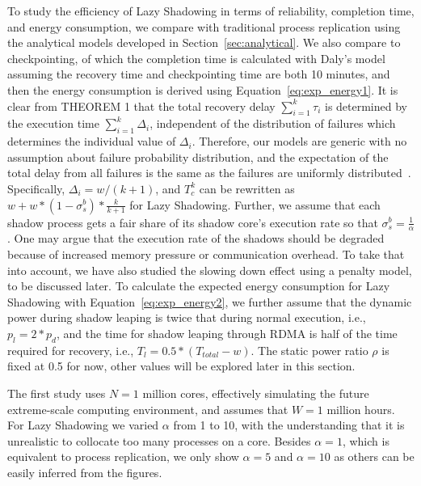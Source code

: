 To study the efficiency of Lazy Shadowing in terms of reliability, completion time, and energy consumption, we compare with traditional process replication using the analytical models developed in Section~\ref{sec:analytical}. We also compare to checkpointing, of which the completion time is calculated with Daly's model~\cite{daly_fgcs_2006} assuming the recovery time and checkpointing time are both 10 minutes, and then the energy consumption is derived using Equation~\ref{eq:exp_energy1}. 
It is clear from THEOREM 1 that the total recovery delay $\sum_{i=1}^k\tau_i$ is determined by the execution time $\sum_{i=1}^k\Delta_i$, independent of the distribution of failures which determines 
the individual value of $\Delta_i$. 
Therefore, our models are generic with no assumption about failure probability distribution, and the expectation of the total delay from all failures is the same as the failures are uniformly distributed~\cite{daly_fgcs_2006}. Specifically, $\Delta_i = w/(k+1)$, and $T_c^k$ can be rewritten as $w + w*(1-\sigma_s^b)*\frac{k}{k+1}$ for Lazy Shadowing. Further, we assume that each shadow process gets a fair share of its shadow core's execution rate so that $\sigma_s^b = \frac{1}{\alpha}$. One may argue that the execution rate of the shadows
should be degraded because of increased memory pressure or communication overhead. %
To take that into account, we have also studied the slowing down effect using a penalty model, to be discussed later. 
To calculate the expected energy consumption for Lazy Shadowing with Equation~\ref{eq:exp_energy2}, we further assume that the dynamic power during shadow leaping is twice that during normal execution, i.e., $p_{l}=2*p_d$, and the time for shadow leaping through RDMA is half of the time required for recovery, i.e., $T_l=0.5*(T_{total} - w)$. The static power ratio $\rho$ is fixed at 0.5 for now, other values will be explored later in this section.

The first study uses $N=1$ million cores, effectively simulating the future extreme-scale computing environment, and assumes that $W=1$ million hours. 
For Lazy Shadowing we varied $\alpha$ from 1 to 10, with the understanding that it is unrealistic to collocate too many processes on a core. Besides $\alpha=1$, which is equivalent to process replication, we only show $\alpha=5$ and $\alpha=10$ as others can be easily inferred from the figures.

